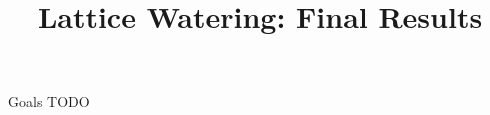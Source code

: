 \documentclass[10pt, xcolor=svgnames]{beamer}
\title{Lattice Watering: Final Results}
\begin{document}
\maketitle

\begin{frame}{Goals}
    TODO
\end{frame}
\end{document}
